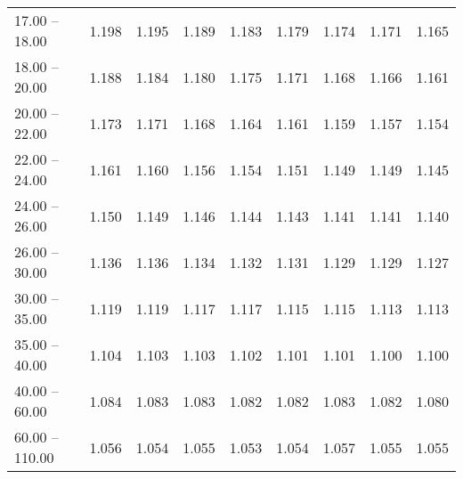 \begin{table}[htp]
\begin{tiny}
\begin{center}
\begin{tabular}{|l|c|c|c|c|c|c|c|c|}
      17.00 -- 18.00 &  1.198 & 1.195 & 1.189 & 1.183 & 1.179 & 1.174 & 1.171 & 1.165 \\ 
      18.00 -- 20.00 &  1.188 & 1.184 & 1.180 & 1.175 & 1.171 & 1.168 & 1.166 & 1.161 \\ 
      20.00 -- 22.00 &  1.173 & 1.171 & 1.168 & 1.164 & 1.161 & 1.159 & 1.157 & 1.154 \\ 
      22.00 -- 24.00 &  1.161 & 1.160 & 1.156 & 1.154 & 1.151 & 1.149 & 1.149 & 1.145 \\ 
      24.00 -- 26.00 &  1.150 & 1.149 & 1.146 & 1.144 & 1.143 & 1.141 & 1.141 & 1.140 \\ 
      26.00 -- 30.00 &  1.136 & 1.136 & 1.134 & 1.132 & 1.131 & 1.129 & 1.129 & 1.127 \\ 
      30.00 -- 35.00 &  1.119 & 1.119 & 1.117 & 1.117 & 1.115 & 1.115 & 1.113 & 1.113 \\ 
      35.00 -- 40.00 &  1.104 & 1.103 & 1.103 & 1.102 & 1.101 & 1.101 & 1.100 & 1.100 \\ 
      40.00 -- 60.00 &  1.084 & 1.083 & 1.083 & 1.082 & 1.082 & 1.083 & 1.082 & 1.080 \\ 
      60.00 -- 110.00 &  1.056 & 1.054 & 1.055 & 1.053 & 1.054 & 1.057 & 1.055 & 1.055 \\ 
\hline
\end{tabular} 
             \end{center} 
             \end{tiny} 
             \label{tab:sa_trpm_psi2s8} 
             \end{table}


